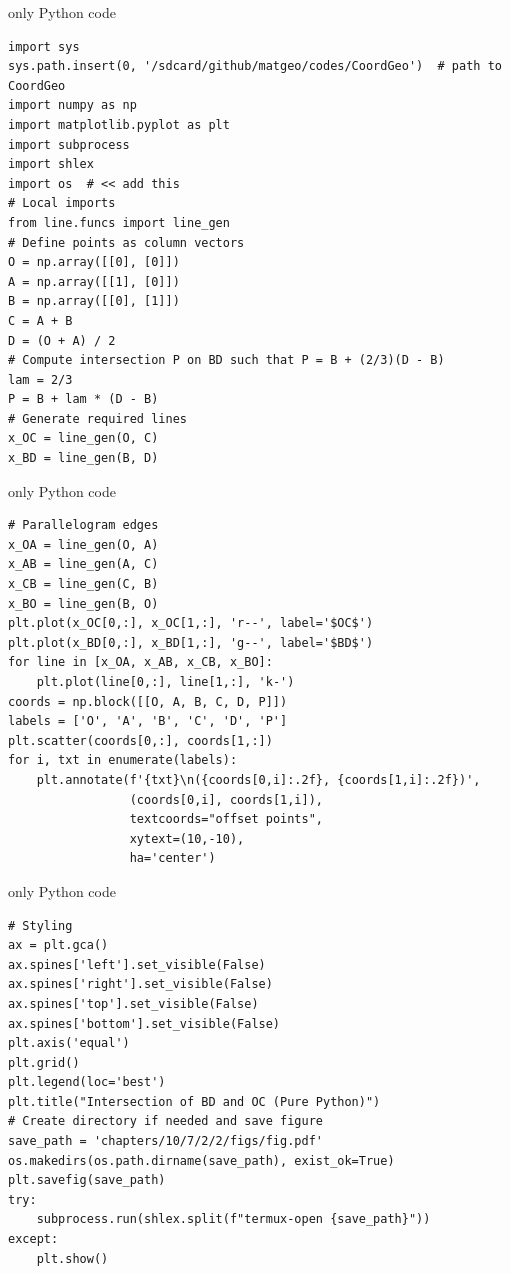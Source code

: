 \documentclass{beamer}
\begin{document}
\begin{frame}[fragile]{only Python code}
\begin{lstlisting}
import sys
sys.path.insert(0, '/sdcard/github/matgeo/codes/CoordGeo')  # path to CoordGeo
import numpy as np
import matplotlib.pyplot as plt
import subprocess
import shlex
import os  # << add this
# Local imports
from line.funcs import line_gen
# Define points as column vectors
O = np.array([[0], [0]])
A = np.array([[1], [0]])
B = np.array([[0], [1]])
C = A + B
D = (O + A) / 2
# Compute intersection P on BD such that P = B + (2/3)(D - B)
lam = 2/3
P = B + lam * (D - B)
# Generate required lines
x_OC = line_gen(O, C)
x_BD = line_gen(B, D)
\end{lstlisting}
\end{frame}
\begin{frame}[fragile]{only Python code}
\begin{lstlisting}
# Parallelogram edges
x_OA = line_gen(O, A)
x_AB = line_gen(A, C)
x_CB = line_gen(C, B)
x_BO = line_gen(B, O)
plt.plot(x_OC[0,:], x_OC[1,:], 'r--', label='$OC$')
plt.plot(x_BD[0,:], x_BD[1,:], 'g--', label='$BD$')
for line in [x_OA, x_AB, x_CB, x_BO]:
    plt.plot(line[0,:], line[1,:], 'k-')
coords = np.block([[O, A, B, C, D, P]])
labels = ['O', 'A', 'B', 'C', 'D', 'P']
plt.scatter(coords[0,:], coords[1,:])
for i, txt in enumerate(labels):
    plt.annotate(f'{txt}\n({coords[0,i]:.2f}, {coords[1,i]:.2f})',
                 (coords[0,i], coords[1,i]),
                 textcoords="offset points",
                 xytext=(10,-10),
                 ha='center')
\end{lstlisting}
\end{frame}
\begin{frame}[fragile]{only Python code}
\begin{lstlisting}
# Styling
ax = plt.gca()
ax.spines['left'].set_visible(False)
ax.spines['right'].set_visible(False)
ax.spines['top'].set_visible(False)
ax.spines['bottom'].set_visible(False)
plt.axis('equal')
plt.grid()
plt.legend(loc='best')
plt.title("Intersection of BD and OC (Pure Python)")
# Create directory if needed and save figure
save_path = 'chapters/10/7/2/2/figs/fig.pdf'
os.makedirs(os.path.dirname(save_path), exist_ok=True)
plt.savefig(save_path)
try:
    subprocess.run(shlex.split(f"termux-open {save_path}"))
except:
    plt.show()
\end{lstlisting}
\end{frame}
\end{document}

